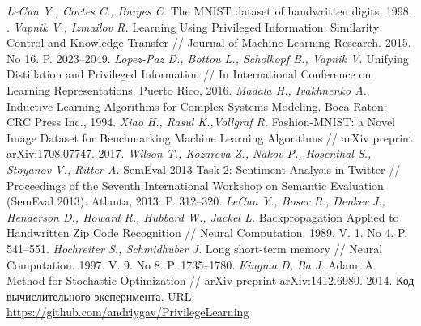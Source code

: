 \documentclass[12pt]{a&t}
\begin{document}
\begin{thebibliography}{10}
	\textit{LeCun Y.,  Cortes C., Burges C.} The MNIST dataset of handwritten digits, 1998. .
	\textit{Vapnik V., Izmailov R.} Learning Using Privileged Information: Similarity Control and Knowledge Transfer // Journal of Machine Learning Research. 2015. No 16. P. 2023--2049.
	\textit{Lopez-Paz D., Bottou L., Scholkopf B., Vapnik V.} Unifying Distillation and Privileged Information // In International Conference on Learning Representations. Puerto Rico, 2016.
	\textit{Madala H., Ivakhnenko A.} Inductive Learning Algorithms for Complex Systems Modeling. Boca Raton: CRC Press Inc., 1994.
	\textit{Xiao H., Rasul K.,Vollgraf R.} Fashion-MNIST: a Novel Image Dataset for Benchmarking Machine Learning Algorithms // arXiv preprint arXiv:1708.07747. 2017.
	\textit{Wilson T., Kozareva Z., Nakov P., Rosenthal S., Stoyanov V., Ritter A.} {S}em{E}val-2013 Task 2: Sentiment Analysis in Twitter // Proceedings of the Seventh International Workshop on Semantic Evaluation ({S}em{E}val 2013). Atlanta, 2013. P. 312--320.
	\textit{LeCun Y., Boser B., Denker J., Henderson D., Howard R., Hubbard W., Jackel L.} Backpropagation Applied to Handwritten Zip Code Recognition // Neural Computation. 1989. V. 1. No 4. P. 541--551.
	\textit{Hochreiter S., Schmidhuber J.} Long short-term memory // Neural Computation. 1997. V. 9. No 8.  P. 1735--1780.
	\textit{Kingma D, Ba J.} Adam: A Method for Stochastic Optimization // arXiv preprint arXiv:1412.6980. 2014.
	Код вычислительного эксперимента. URL: \url{https://github.com/andriygav/PrivilegeLearning}
 \end{thebibliography}



\end{document}
